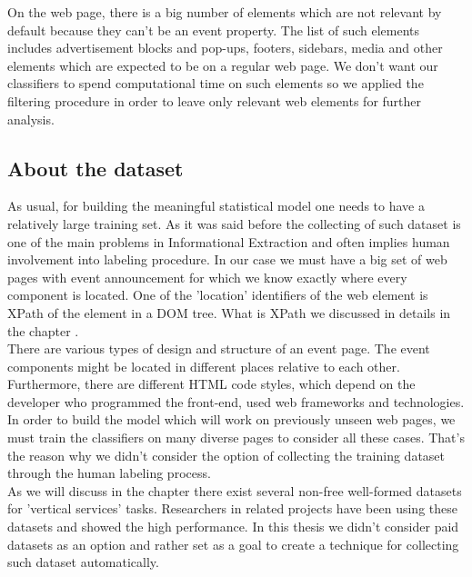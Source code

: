 On the web page, there is a big number of elements which are not relevant by default because they can't be an event property. The list of such elements includes advertisement blocks and pop-ups, footers, sidebars, media and other elements which are expected to be on a regular web page. We don't want our classifiers to spend computational time on such elements so we applied the filtering procedure in order to leave only relevant web elements for further analysis.\\

\subsection*{About the dataset}
As usual, for building the meaningful statistical model one needs to have a relatively large training set. As it was said before the collecting of such dataset is one of the main problems in Informational Extraction and often implies human involvement into labeling procedure. In our case we must have a big set of web pages with event announcement for which we know exactly where every component is located. One of the 'location' identifiers of the web element is XPath of the element in a DOM tree. What is XPath we discussed in details in the chapter .\\

There are various types of design and structure of an event page. The event components might be located in different places relative to each other. Furthermore, there are different HTML code styles, which depend on the developer who programmed the front-end, used web frameworks and technologies. In order to build the model which will work on previously unseen web pages, we must train the classifiers on many diverse pages to consider all these cases. That's the reason why we didn't consider the option of collecting the training dataset through the human labeling process.\\   

As we will discuss in the chapter  there exist several non-free well-formed datasets for 'vertical services' tasks. Researchers in related projects have been using these datasets and showed the high performance. In this thesis we didn't consider paid datasets as an option and rather set as a goal to create a technique for collecting such dataset automatically.\\

